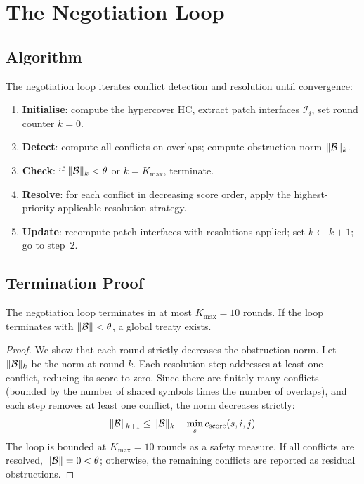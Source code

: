 \documentclass[11pt]{article}
\newcommand{\iface}{\mathcal{I}}
\newcommand{\cscore}[1][]{c_{\mathrm{score}#1}}
\newcommand{\cthresh}{\theta}
\newcommand{\HC}{\mathrm{HC}}
\newcommand{\onorm}{\|\obstr\|}
\begin{document}
\section{The Negotiation Loop}\label{sec:negotiation}

\subsection{Algorithm}

The negotiation loop iterates conflict detection and resolution
until convergence:

\begin{construction}\label{cons:negotiation}
\begin{enumerate}[nosep]
\item \textbf{Initialise}: compute the hypercover $\HC$, extract
  patch interfaces $\iface_i$, set round counter $k = 0$.
\item \textbf{Detect}: compute all conflicts on overlaps;
  compute obstruction norm $\onorm_k$.
\item \textbf{Check}: if $\onorm_k < \cthresh$ or $k = K_{\max}$,
  terminate.
\item \textbf{Resolve}: for each conflict in decreasing score
  order, apply the highest-priority applicable resolution strategy.
\item \textbf{Update}: recompute patch interfaces with resolutions
  applied; set $k \gets k + 1$; go to step~2.
\end{enumerate}
\end{construction}

\subsection{Termination Proof}

\begin{theorem}[Termination]\label{thm:termination}
The negotiation loop terminates in at most $K_{\max} = 10$ rounds.
If the loop terminates with $\onorm < \cthresh$, a global treaty
exists.
\end{theorem}

\begin{proof}
We show that each round strictly decreases the obstruction norm.
Let $\onorm_k$ be the norm at round $k$.  Each resolution step
addresses at least one conflict, reducing its score to zero.
Since there are finitely many conflicts (bounded by the number of
shared symbols times the number of overlaps), and each step removes
at least one conflict, the norm decreases strictly:
\[
  \onorm_{k+1} \leq \onorm_k - \min_s \cscore(s, i, j)
\]
The loop is bounded at $K_{\max} = 10$ rounds as a safety measure.
If all conflicts are resolved, $\onorm = 0 < \cthresh$; otherwise,
the remaining conflicts are reported as residual obstructions.
\end{proof}
\end{document}
